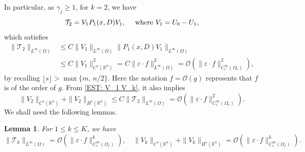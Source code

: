 \documentclass [oneside,11pt] {amsart}
\newcommand{\floor}[1]{\lfloor #1 \rfloor}
\numberwithin{equation}{section}
\newtheorem{lemma}{Lemma}[section]
\newcommand{\R}{\mathbb{R}}
\begin{document}
In particular, as $\gamma_j\geq 1$, for $k=2$, we have
$$
\mathcal T_{2} =V_1P_1(x,D)V_1,\quad \hbox{ where $V_1=U_0-U_1$}, 
$$
which satisfies 
\begin{align*}
\|\mathcal{T}_2\|_{L^\infty(\Omega)} &\leq C \| V_1\|_{L^\infty(\Omega)}\|P_1(x,D)V_1\|_{L^\infty(\Omega)}\\
&\leq C \|V_1\|_{C^s(\R^n)}^2 =C \|\varepsilon\cdot f\|_{L^\infty(\Omega)}^2
= \mathcal{O}(\|\varepsilon\cdot f\|^2_{C_c^\infty(\Omega_e)}),
\end{align*}
by recalling $\floor{s}>\max\{m,\,n/2\}$. Here the notation $f=\mathcal{O}(g)$ represents that $f$ is of the order of $g$. From \eqref{EST: V_1 V_k}, it also implies
$$
    \|V_2\|_{C^s(\R^n)}+\|V_2\|_{H^s(\R^n)}\leq C\|{\mathcal{T}}_2\|_{L^\infty(\Omega)} = \mathcal{O}(\|\varepsilon\cdot f\|^2_{C_c^\infty(\Omega_e)}).
$$
We shall need the following lemmas. 
\begin{lemma}\label{prop_est_V&T}
For $1\le k\le K$, we have 
\begin{equation}\label{eq_est_V&T}
\|\mathcal{T}_k\|_{L^\infty(\Omega)} = \mathcal{O}(\|\varepsilon\cdot f\|^k_{C_c^\infty(\Omega_e)}),\quad
\|V_k\|_{C^s(\R^n)}+\|V_k\|_{H^s(\R^n)}
= \mathcal{O}(\|\varepsilon\cdot f\|^k_{C_c^\infty(\Omega_e)}).
\end{equation}
\end{lemma}
\end{document}
